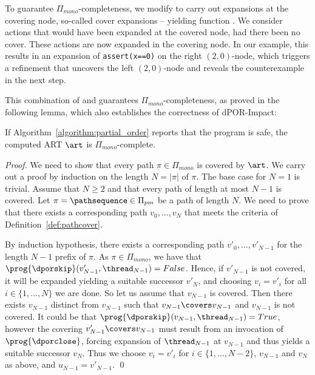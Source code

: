 \documentclass[conference]{IEEEtran}
\begin{document}
\begin{comment}
Similar to dynamic partial-order reduction techniques~\cite{DBLP:conf/spin/YangCGK08},
we introduce additional interleavings to ensure soundness.
\end{comment}

To guarantee $\Pi_{mono}$-completeness, 
we modify  to carry out expansions at the covering node, so-called cover expansions
-- yielding function \prog{\dporclose}. 
We consider actions that would have been expanded at the covered node,
had there been no cover. These actions are now expanded in the covering node.
In our example, this results in an expansion of \texttt{assert(x==0)} on the
right $(2,0)$-node, which triggers a refinement that uncovers the left $(2,0)$-node
and reveals the counterexample in the next step.

This combination of \prog{\dporexpand} and \prog{\dporclose} guarantees $\Pi_{mono}$-completeness,
as proved in the following lemma, which also establishes the correctness of dPOR-Impact:

\begin{lemma}
  If Algorithm~\ref{algorithm:partial_order} reports that the program is safe,
  the computed ART $\art$ is $\Pi_{mono}$-complete.
  \label{lemma:algorithm:partial}
\end{lemma}

\begin{proof}
  We need to show that every path $\pi \in \Pi_{mono}$ is covered by $\art$. 
  We carry out a proof by induction on the length $N=|\pi|$ of $\pi$.  
  The base case for $N=1$ is trivial.  
  Assume that $N\geq 2$ and that every path of length at most $N-1$ is covered.  
  Let \mbox{$\pi = \pathsequence \in \Pi_{pm}$} be a path of length $N$.  
  We need to prove that there exists a corresponding path ${v}_0,\ldots,{v}_{N}$
  that meets the criteria of Definition~\ref{def:pathcover}.

  By induction hypothesis, there exists a corresponding path ${v'}_0,\ldots,{v'}_{N-1}$ 
  for the length $N-1$ prefix of $\pi$.
  As $\pi\in\Pi_{mono}$, we have that $\prog{\dporskip}(v'_{N-1},\thread_{N-1})=False$.
  Hence, if $v'_{N-1}$ is not covered, it will be expanded yielding a suitable successor $v'_N$,
  and choosing $v_i = v'_i$ for all $i\in\{1,\ldots,N\}$ we are done.
  So let us assume that $v_{N-1}$ is covered.
  Then there exists $v_{N-1}$ distinct from
  $v_{N-1}$ such that $v_{N-1} \covers v_{N-1}$ and $v_{N-1}$ is not covered.
  It could be that $\prog{\dporskip}(v_{N-1},\thread_{N-1})=True$,
  however the covering $v'_{N-1} \covers v_{N-1}$ must result from
  an invocation of $\prog{\dporclose}$, forcing expansion of $\thread_{N-1}$
  at $v_{N-1}$ and thus yields a suitable successor $v_N$.
  Thus we choose $v_i = {v'}_i $ for $i\in\{1,\ldots,N-2\}$,
  $v_{N-1}$ and $v_N$ as above, and $u_{N-1}=v'_{N-1}$.
  \qed
\end{proof}
\end{document}
